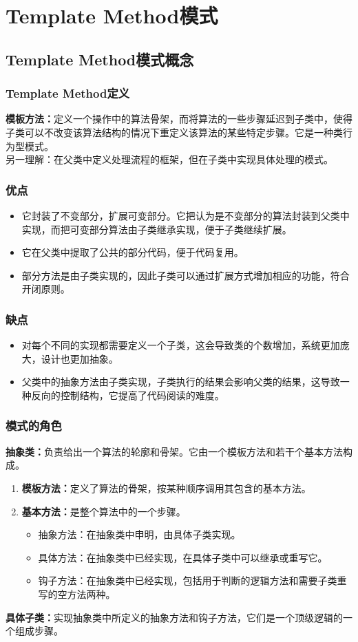 \chapter{Template Method模式}
\section{Template Method模式概念}
\subsection{Template Method定义}
\noindent \textbf{模板方法：}定义一个操作中的算法骨架，而将算法的一些步骤延迟到子类中，使得子类可以不改变该算法结构的情况下重定义该算法的某些特定步骤。它是一种类行为型模式。
\\ 另一理解：在父类中定义处理流程的框架，但在子类中实现具体处理的模式。
\subsection{优点}
\begin{itemize}
	\item 它封装了不变部分，扩展可变部分。它把认为是不变部分的算法封装到父类中实现，而把可变部分算法由子类继承实现，便于子类继续扩展。
	\item 它在父类中提取了公共的部分代码，便于代码复用。
	\item 部分方法是由子类实现的，因此子类可以通过扩展方式增加相应的功能，符合开闭原则。
\end{itemize}
\subsection{缺点}
\begin{itemize}
	\item 对每个不同的实现都需要定义一个子类，这会导致类的个数增加，系统更加庞大，设计也更加抽象。
	\item 父类中的抽象方法由子类实现，子类执行的结果会影响父类的结果，这导致一种反向的控制结构，它提高了代码阅读的难度。
\end{itemize}
\subsection{模式的角色}
\noindent \textbf{抽象类：}负责给出一个算法的轮廓和骨架。它由一个模板方法和若干个基本方法构成。
\begin{enumerate}
	\item \textbf{模板方法：}定义了算法的骨架，按某种顺序调用其包含的基本方法。
	\item \textbf{基本方法：}是整个算法中的一个步骤。
	\begin{itemize}
		\item 抽象方法：在抽象类中申明，由具体子类实现。
		\item 具体方法：在抽象类中已经实现，在具体子类中可以继承或重写它。
		\item 钩子方法：在抽象类中已经实现，包括用于判断的逻辑方法和需要子类重写的空方法两种。
	\end{itemize}
\end{enumerate}
\textbf{具体子类：}实现抽象类中所定义的抽象方法和钩子方法，它们是一个顶级逻辑的一个组成步骤。
